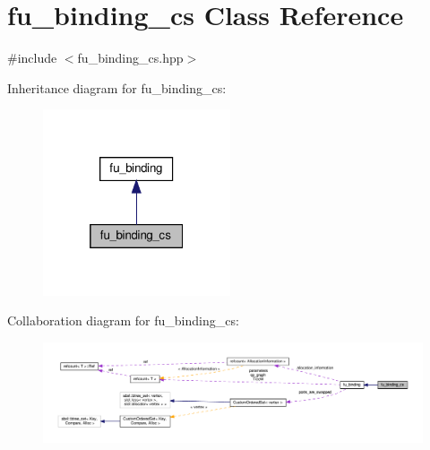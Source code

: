 \hypertarget{classfu__binding__cs}{}\section{fu\+\_\+binding\+\_\+cs Class Reference}
\label{classfu__binding__cs}


{\ttfamily \#include $<$fu\+\_\+binding\+\_\+cs.\+hpp$>$}



Inheritance diagram for fu\+\_\+binding\+\_\+cs\+:
\nopagebreak
\begin{figure}[H]
\begin{center}
\leavevmode
\includegraphics[width=157pt]{dc/d88/classfu__binding__cs__inherit__graph}
\end{center}
\end{figure}


Collaboration diagram for fu\+\_\+binding\+\_\+cs\+:
\nopagebreak
\begin{figure}[H]
\begin{center}
\leavevmode
\includegraphics[width=350pt]{d3/d7b/classfu__binding__cs__coll__graph}
\end{center}
\end{figure}
